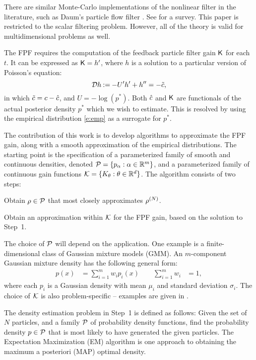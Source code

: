There are similar Monte-Carlo implementations of the nonlinear filter in the literature, such as   Daum's particle flow filter \cite{DaumHuang10}.   See \cite{taoyang_acc14} for a survey. This paper is restricted to the scalar filtering problem. However, all of the theory is valid for multidimensional problems as well.

The FPF requires the computation of the feedback particle filter gain $\text{\sf K}$ for each $t$. It can be expressed as $\text{\sf K}= h'$, where $h$ is a solution to a particular version of Poisson's equation:
\begin{equation}
\clD h
\eqdef
-U' h'+ h'' = -\tilc ,
\label{eq_fish}
\end{equation}
in which $\tilde c = c - {\hat c}$,  and $U = -\log(p^*) $.
Both ${\hat c}$ and $\text{\sf K}$ are functionals of the actual posterior density $p^*$  which we wish to estimate.  This is resolved by using the empirical distribution \eqref{e:emp} as a surrogate for $p^*$.


The contribution of this work is to develop algorithms to approximate the FPF gain, along with a smooth approximation of the empirical distributions.  The starting point is the specification of a parameterized family  of smooth and continuous densities, denoted  ${\cal P} = \{ p_\alpha : \alpha\in\mathbb{R}^m\}$,  and a parameterized family of continuous gain functions ${\cal K} = \{K_\theta : \theta\in\mathbb{R}^d\}$.
The algorithm consists of two steps:
\begin{arabnum}
	\item Obtain $\rho\in{\cal P} $ that most closely approximates $\rho^{(N)}$.
	\item  Obtain an approximation within ${\cal K}$ for the FPF gain, based on the solution to Step~1.
\end{arabnum}
The choice of ${\cal P}$ will depend on the application.
One example is a finite-dimensional class of Gaussian mixture models (GMM). An $m$-component Gaussian mixture density has the following general form:
\begin{equation*}
\begin{aligned}
p(x)& = \sum_{i=1}^{m} w_{i} p_{i}(x) \qquad  \sum_{i=1}^{m} w_{i} &=1 ,
\label{gaussian_mix}
\end{aligned}
\end{equation*}
\noindent
where each $p_{i}$ is a Gaussian density with mean $\mu_{i}$ and standard deviation $\sigma_{i}$.
The choice of ${\cal K}$ is also problem-specific -- examples are given in .

The density estimation problem in Step~1 is defined as follows: Given the set of $N$ particles, and a family ${\cal P} $ of probability density functions,  find the probability density $p \in {\cal P} $ that is most likely to have generated the given particles.  The
Expectation Maximization (EM) algorithm is one approach to obtaining the maximum a posteriori (MAP) optimal density.

